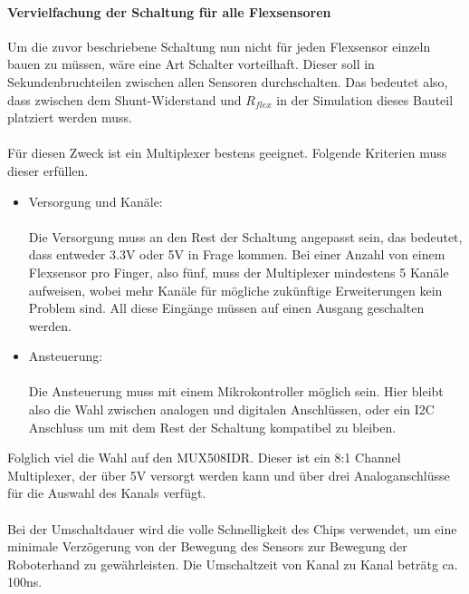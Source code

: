 \documentclass[titlepage,12pt,twoside]{article}
\begin{document}
\paragraph{Vervielfachung der Schaltung für alle Flexsensoren}
\hfill \break
\hfill \break
Um die zuvor beschriebene Schaltung nun nicht für jeden Flexsensor einzeln bauen zu müssen, wäre eine Art Schalter vorteilhaft.
Dieser soll in Sekundenbruchteilen zwischen allen Sensoren durchschalten. Das bedeutet also, dass zwischen dem Shunt-Widerstand
und $R_{flex}$ in der Simulation dieses Bauteil platziert werden muss. \\
\\
Für diesen Zweck ist ein Multiplexer bestens geeignet. Folgende Kriterien muss dieser erfüllen.
\begin{itemize}
	\item Versorgung und Kanäle: \\
		  \\ 
		  Die Versorgung muss an den Rest der Schaltung angepasst sein, das bedeutet, dass entweder 3.3V oder 5V in Frage kommen.
		  Bei einer Anzahl von einem Flexsensor pro Finger, also fünf, muss der Multiplexer mindestens 5 Kanäle aufweisen, wobei 
		  mehr Kanäle für mögliche zukünftige Erweiterungen kein Problem sind. All diese Eingänge müssen auf einen Ausgang geschalten
		  werden.
	\item Ansteuerung: \\
		  \\ 
		  Die Ansteuerung muss mit einem Mikrokontroller möglich sein. Hier bleibt also die Wahl zwischen analogen und digitalen 
		  Anschlüssen, oder ein I2C Anschluss um mit dem Rest der Schaltung kompatibel zu bleiben.
\end{itemize}
Folglich viel die Wahl auf den MUX508IDR. Dieser ist ein 8:1 Channel Multiplexer, der über 5V versorgt werden kann und über drei 
Analoganschlüsse für die Auswahl des Kanals verfügt. \\
\\
Bei der Umschaltdauer wird die volle Schnelligkeit des Chips verwendet, um eine minimale Verzögerung von der Bewegung des Sensors zur Bewegung 
der Roboterhand zu gewährleisten. Die Umschaltzeit von Kanal zu Kanal beträtg ca. 100ns.
\\
\end{document}

